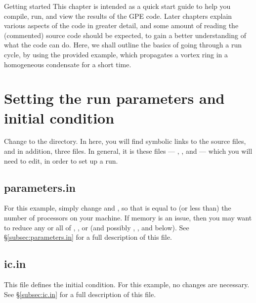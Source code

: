 %
%
%

\begin{chapter}{\label{cha:quickstart}Getting started}
  This chapter is intended as a quick start guide to help you compile, run, and
  view the results of the GPE code.  Later chapters explain various aspects of
  the code in greater detail, and some amount of reading the (commented) source
  code should be expected, to gain a better understanding of what the code can
  do.  Here, we shall outline the basics of going through a run cycle, by using
  the provided  example, which propagates a vortex ring in a
  homogeneous condensate for a short time.

  \section{Setting the run parameters and initial condition}
  Change to the  directory.  In here, you
  will find symbolic links to the source files, and in addition, three
   files.  In general, it is these files ---
  , , and  --- which you
  will need to edit, in order to set up a run.

  \subsection{parameters.in}
  For this example, simply change  and , so
  that  is equal to (or less than) the number of
  processors on your machine.  If memory is an issue, then you may want to
  reduce any or all of , , or  (and possibly
  , , and  below).  See
  \S\ref{subsec:parameters.in} for a full description of this file.  

  \subsection{ic.in}
  This file defines the initial condition.  For this example, no changes are
  necessary.  See \S\ref{subsec:ic.in} for a full description of this file.


\end{chapter}
